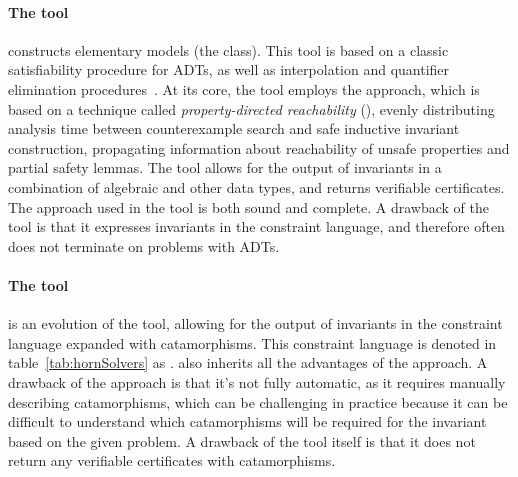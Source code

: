 \paragraph{The \spacer{} tool~\cite{komuravelli2016smt}} constructs elementary models (the \elemclass{} class). This tool is based on a classic satisfiability procedure for ADTs, as well as interpolation and quantifier elimination procedures~\cite{bjorner2015playing}. At its core, the tool employs the \spacer{} approach, which is based on a technique called \emph{property-directed reachability} (\pdr{}), evenly distributing analysis time between counterexample search and safe inductive invariant construction, propagating information about reachability of unsafe properties and partial safety lemmas. The tool allows for the output of invariants in a combination of algebraic and other data types, and returns verifiable certificates. The approach used in the tool is both sound and complete. A drawback of the tool is that it expresses invariants in the constraint language, and therefore often does not terminate on problems with ADTs.


\paragraph{The \racer{} tool~\cite{10.1145/3498722}} is an evolution of the \spacer{} tool, allowing for the output of invariants in the constraint language expanded with catamorphisms. This constraint language is denoted in table~\ref{tab:hornSolvers} as \catelemclass{}. \racer{} also inherits all the advantages of the \spacer{} approach. A drawback of the approach is that it's not fully automatic, as it requires manually describing catamorphisms, which can be challenging in practice because it can be difficult to understand which catamorphisms will be required for the invariant based on the given problem. A drawback of the tool itself is that it does not return any verifiable certificates with catamorphisms.

